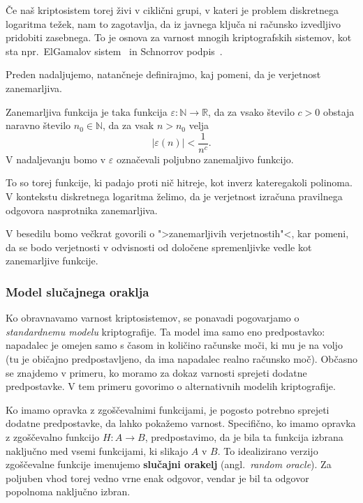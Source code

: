 \documentclass[isrm2, tisk]{fmfdelo}
\newcommand{\R}{\mathbb R}
\newcommand{\N}{\mathbb N}
\begin{document}
Če naš kriptosistem torej živi v ciklični grupi, v kateri je problem diskretnega logaritma težek,
nam to zagotavlja, da iz javnega ključa ni računsko izvedljivo pridobiti zasebnega. To je osnova
za varnost mnogih kriptografskih sistemov, kot sta npr.\ ElGamalov sistem~\cite{elgamal1985elgamal}
in Schnorrov podpis~\cite{schnorr1989sig}.

Preden nadaljujemo, natančneje definirajmo, kaj pomeni, da je verjetnost zanemarljiva.

\begin{definicija}
    Zanemarljiva funkcija je taka funkcija $\varepsilon : \N \rightarrow \R$, da za vsako število
    $c > 0$ obstaja naravno število $n_0 \in \N$, da za vsak $n > n_0$ velja
    $$
    |\varepsilon(n)| < \frac{1}{n^c}.
    $$
    V nadaljevanju bomo v $\varepsilon$ označevali poljubno zanemaljivo funkcijo.
\end{definicija}

To so torej funkcije, ki padajo proti nič hitreje, kot inverz kateregakoli polinoma. V kontekstu
diskretnega logaritma želimo, da je verjetnost izračuna pravilnega odgovora nasprotnika zanemarljiva.

V besedilu bomo večkrat govorili o ">zanemarljivih verjetnostih"<, kar pomeni, da se bodo
verjetnosti v odvisnosti od določene spremenljivke vedle kot zanemarljive funkcije.

\subsubsection{Model slučajnega oraklja}
Ko obravnavamo varnost kriptosistemov, se ponavadi pogovarjamo o \textit{standardnemu modelu} kriptografije.
Ta model ima samo eno predpostavko: napadalec je omejen samo s časom in količino računske moči, ki mu
je na voljo (tu je običajno predpostavljeno, da ima napadalec realno računsko moč). Občasno se znajdemo
v primeru, ko moramo za dokaz varnosti sprejeti dodatne predpostavke. V tem primeru govorimo o
alternativnih modelih kriptografije. 

Ko imamo opravka z zgoščevalnimi funkcijami, je pogosto potrebno sprejeti dodatne predpostavke, da lahko
pokažemo varnost. Specifično, ko imamo opravka z zgoščevalno funkcijo $H: A \rightarrow B$, predpostavimo,
da je bila ta funkcija izbrana naključno med vsemi funkcijami, ki slikajo $A$ v $B$. To idealizirano 
verzijo zgoščevalne funkcije imenujemo \textbf{slučajni orakelj} (angl.\ \textit{random oracle}).
Za poljuben vhod torej vedno vrne enak odgovor, vendar je bil ta odgovor popolnoma naključno izbran.
\end{document}
